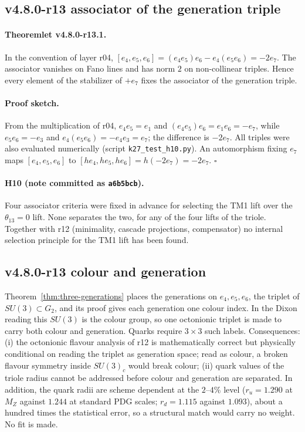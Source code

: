 \subsection*{v4.8.0-r13 associator of the generation triple}
\label{subsec:v480-r13-associator}

\paragraph{Theoremlet v4.8.0-r13.1.}
In the convention of layer r04, \([e_4,e_5,e_6]=(e_4e_5)e_6-e_4(e_5e_6)=-2e_7\).  The associator vanishes on Fano
lines and has norm \(2\) on non-collinear triples.  Hence every element of the stabilizer of \(+e_7\) fixes the
associator of the generation triple.

\paragraph{Proof sketch.}
From the multiplication of r04, \(e_4e_5=e_1\) and \((e_4e_5)e_6=e_1e_6=-e_7\), while \(e_5e_6=-e_3\) and
\(e_4(e_5e_6)=-e_4e_3=e_7\); the difference is \(-2e_7\).  All triples were also evaluated numerically
(script \texttt{k27\_test\_h10.py}).  An automorphism fixing \(e_7\)
maps \([e_4,e_5,e_6]\) to \([he_4,he_5,he_6]=h(-2e_7)=-2e_7\).  \(\square\)

\paragraph{H10 (note committed as \texttt{a6b5bcb}).}
Four associator criteria were fixed in advance for selecting the TM1 lift over the \(\theta_{13}=0\) lift.  None
separates the two, for any of the four lifts of the triole.  Together with r12 (minimality, cascade projections,
compensator) no internal selection principle for the TM1 lift has been found.

\subsection*{v4.8.0-r13 colour and generation}
\label{subsec:v480-r13-colour-generation}

Theorem~\ref{thm:three-generations} places the generations on \(e_4,e_5,e_6\), the triplet of
\(SU(3)\subset G_2\), and its proof gives each generation one colour index.  In the Dixon reading this \(SU(3)\)
is the colour group, so one octonionic triplet is made to carry both colour and generation.  Quarks require
\(3\times3\) such labels.  Consequences: (i) the octonionic flavour analysis of r12 is mathematically correct but
physically conditional on reading the triplet as generation space; read as colour, a broken flavour symmetry
inside \(SU(3)_c\) would break colour; (ii) quark values of the triole radius cannot be addressed before colour
and generation are separated.  In addition, the quark radii are scheme dependent at the \(2\)--\(4\%\) level
(\(r_u=1.290\) at \(M_Z\) against \(1.244\) at standard PDG scales; \(r_d=1.115\) against \(1.093\)), about
a hundred times the statistical error, so a structural match would carry no weight.  No fit is made.

